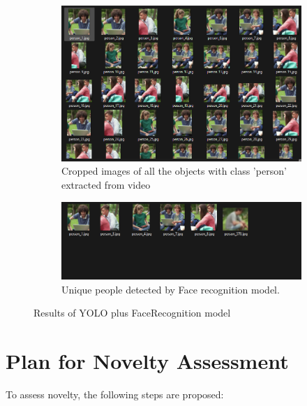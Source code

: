 \documentclass[twoside,english]{article}
\begin{document}
\begin{figure}[!h]
    \begin{subfigure}{.5\textwidth}
          \centering
          \includegraphics[width=0.9\linewidth]{imgs/out3.png}
          \caption{Cropped images of all the objects with class 'person' extracted from video}
          \label{out2a}
    \end{subfigure}%
    \begin{subfigure}{.5\textwidth}
          \centering
          \includegraphics[width=0.9\linewidth]{imgs/out4.png}
          \caption{Unique people detected by Face recognition model.}
          \label{out2b}
    \end{subfigure}
    
    \caption{Results of YOLO plus FaceRecognition model}
    \label{out2}
\end{figure}


\section{Plan for Novelty Assessment} \label{sec:Plan for Novelty Assessment}
    \vspace{-0.3cm}

    To assess novelty, the following steps are proposed:
    
    \vspace{-0.2cm}
        
\end{document}
